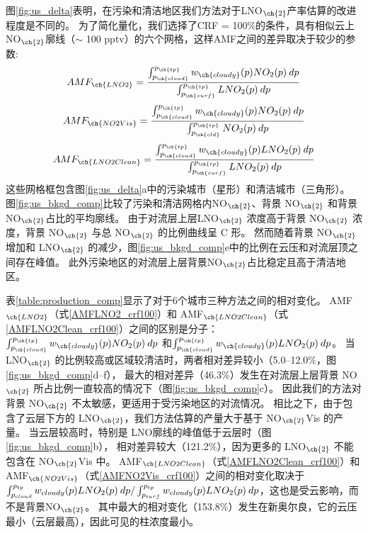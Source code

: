 图\ref{fig:us_delta}表明，在污染和清洁地区我们方法对于LNO$_{\ch{2}}$产率估算的改进程度是不同的。
为了简化量化，我们选择了CRF = 100\%的条件，具有相似云上NO$_{\ch{2}}$廓线（$\sim$ 100 pptv）的六个网格，这样AMF之间的差异取决于较少的参数:
\begin{equation} \label{AMFLNO2_crf100}
AMF_{\ch{LNO2}} = \frac{\int_{p_{\ch{cloud}}}^{p_{\ch{tp}}} w_{\ch{cloudy}}(p) NO_2(p) \: dp}{\int_{p_{\ch{surf}}}^{p_{\ch{tp}}} LNO_2(p) \: dp}
\end{equation}
\begin{equation} \label{AMFNO2Vis_crf100}
AMF_{\ch{NO2Vis}} = \frac{\int_{p_{\ch{cloud}}}^{p_{\ch{tp}}} w_{\ch{cloudy}}(p) NO_2(p) \: dp}{\int_{p_{\ch{cld}}}^{p_{\ch{tp}}} NO_2(p) \: dp}
\end{equation}
\begin{equation} \label{AMFLNO2Clean_crf100}
AMF_{\ch{LNO2Clean}} = \frac{\int_{p_{\ch{cloud}}}^{p_{\ch{tp}}} w_{\ch{cloudy}}(p) LNO_2(p) \: dp}{\int_{p_{\ch{surf}}}^{p_{\ch{tp}}} LNO_2(p) \: dp}
\end{equation}
这些网格框包含图\ref{fig:us_delta}a中的污染城市（星形）和清洁城市（三角形）。
图\ref{fig:us_bkgd_comp}比较了污染和清洁网格内NO$_{\ch{2}}$、背景 NO$_{\ch{2}}$ 和背景 NO$_{\ch{2}}$占比的平均廓线。
由于对流层上层LNO$_{\ch{2}}$ 浓度高于背景 NO$_{\ch{2}}$ 浓度，背景 NO$_{\ch{2}}$ 与总 NO$_{\ch{2}}$ 的比例曲线呈 C 形。
然而随着背景 NO$_{\ch{2}}$ 增加和 LNO$_{\ch{2}}$ 的减少，图\ref{fig:us_bkgd_comp}e中的比例在云压和对流层顶之间存在峰值。
此外污染地区的对流层上层背景NO$_{\ch{2}}$占比稳定且高于清洁地区。

表\ref{table:production_comp}显示了对于6个城市三种方法之间的相对变化。
AMF$_{\ch{LNO2}}$（式\ref{AMFLNO2_crf100}）和 AMF$_{\ch{LNO2Clean}}$（式\ref{AMFLNO2Clean_crf100}）之间的区别是分子：
$\int_{p_{\ch{cloud}}}^{p_{\ch{tp}}} w_{\ch{cloudy}}(p) NO_2(p) \: dp$
和$\int_{p_{\ch{cloud}}}^{p_{\ch{tp}}} w_{\ch{cloudy}}(p) LNO_2(p) \: dp$。
当 LNO$_{\ch{2}}$ 的比例较高或区域较清洁时，两者相对差异较小（5.0--12.0\%，图\ref{fig:us_bkgd_comp}d--f），
最大的相对差异（46.3\%）发生在对流层上层背景 NO$_{\ch{2}}$ 所占比例一直较高的情况下（图\ref{fig:us_bkgd_comp}c）。
因此我们的方法对背景 NO$_{\ch{2}}$ 不太敏感，更适用于受污染地区的对流情况。
相比之下，由于包含了云层下方的 LNO$_{\ch{2}}$，我们方法估算的产量大于基于 NO$_{\ch{2}}$Vis 的产量。
当云层较高时，特别是 LNO廓线的峰值低于云层时（图\ref{fig:us_bkgd_comp}b），
相对差异较大（121.2\%），因为更多的 LNO$_{\ch{2}}$ 不能包含在 NO$_{\ch{2}}$Vis 中。
AMF$_{\ch{LNO2Clean}}$（式\ref{AMFLNO2Clean_crf100}）和 AMF$_{\ch{NO2Vis}}$（式\ref{AMFNO2Vis_crf100}）之间的相对变化取决于
$\int_{p_{\textrm cloud}}^{p_{\textrm tp}} w_{\textrm cloudy}(p) LNO_2(p) \: dp / \int_{p_{\textrm surf}}^{p_{\textrm tp}} w_{\textrm cloudy}(p) LNO_2(p) \: dp$，这也是受云影响，而不是背景NO$_{\ch{2}}$。
其中最大的相对变化（153.8\%）发生在新奥尔良，它的云压最小（云层最高），因此可见的柱浓度最小。


